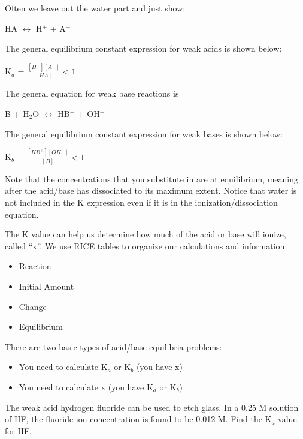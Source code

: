 \documentclass[../hchem.tex]{subfiles}
\begin{document}
Often we leave out the water part and just show:
\begin{center}
    HA $\leftrightarrow$ H$^+$ + A$^-$
\end{center}

The general equilibrium constant expression for weak acids is shown below:
\begin{center}
    K$_a$ = $\frac{[H^+][A^-]}{[HA]}<1$
\end{center}

The general equation for weak base reactions is 
\begin{center}
    B + H$_2$O $\leftrightarrow$ HB$^+$ + OH$^-$
\end{center}

The general equilibrium constant expression for weak bases is shown below:
\begin{center}
    K$_b$ = $\frac{[HB^+][OH^-]}{[B]}<1$
\end{center}

Note that the concentrations that you substitute in are at equilibrium, meaning after the acid/base has dissociated to its maximum extent. Notice that 
water is not included in the K expression even if it is in the ionization/dissociation equation.

The K value can help us determine how much of the acid or base will ionize, called ``x''. We use RICE tables to organize our calculations and information.
\begin{itemize}
    \item Reaction 
    \item Initial Amount 
    \item Change 
    \item Equilibrium 
\end{itemize}
There are two basic types of acid/base equilibria problems:
\begin{itemize}
    \item You need to calculate K$_a$ or K$_b$ (you have x)
    \item You need to calculate x (you have K$_a$ or K$_b$)
\end{itemize}

\ex The weak acid hydrogen fluoride can be used to etch glass. In a 0.25 M solution of HF, the fluoride ion concentration is found to be 0.012 M. Find the K$_a$ value for HF. 
\end{document}
